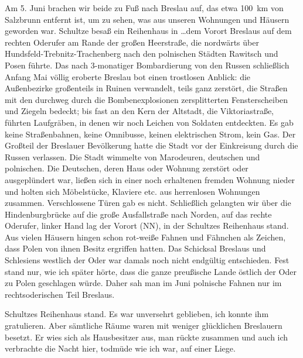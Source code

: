 \documentclass[a5paper,pagesize,10pt,twoside=true]{scrbook}
\renewcommand{\marginpar}[2][]{}
\begin{document}
Am 5. Juni brachen wir beide zu Fuß nach Breslau auf, das etwa 100~km von Salzbrunn entfernt ist, um zu sehen, was aus unseren Wohnungen und Häusern geworden \marginpar{85} war. Schultze besaß ein Reihenhaus in \dots dem Vorort Breslaus auf dem rechten Oderufer am Rande der großen Heerstraße, die nordwärts über Hundsfeld-Trebnitz-Trachenberg nach den polnischen Städten Rawitsch und Posen führte. Das nach 3-monatiger Bombardierung von den Russen schließlich Anfang Mai völlig eroberte Breslau bot einen trostlosen Anblick: die Außenbezirke großenteils in Ruinen verwandelt, teils ganz zerstört, die Straßen mit den durchweg durch die Bombenexplosionen zersplitterten Fensterscheiben und Ziegeln bedeckt; bis fast an den Kern der Altstadt, die Viktoriastraße, führten Laufgräben, in denen wir noch Leichen von Soldaten entdeckten. Es gab keine Straßenbahnen, keine Omnibusse, keinen elektrischen Strom, kein Gas. Der Großteil der Breslauer Bevölkerung hatte die Stadt vor der Einkreisung durch die Russen verlassen. Die Stadt wimmelte von Marodeuren, deutschen und polnischen. Die Deutschen, deren Haus oder Wohnung zerstört oder ausgeplündert war, ließen sich in einer noch erhaltenen fremden Wohnung nieder und holten sich Möbelstücke, Klaviere etc. aus herrenlosen Wohnungen zusammen. Verschlossene Türen gab es nicht. Schließlich gelangten wir \marginpar{86} über die Hindenburgbrücke auf die große Ausfallstraße nach Norden, auf das rechte Oderufer, linker Hand lag der Vorort (NN), in der Schultzes Reihenhaus stand. Aus vielen Häusern hingen schon rot-weiße Fahnen und Fähnchen als Zeichen, dass Polen von ihnen Besitz ergriffen hatten. Das Schicksal Breslaus und Schlesiens westlich der Oder war damals noch nicht endgültig entschieden. Fest stand nur, wie ich später hörte, dass die ganze preußische Lande östlich der Oder zu Polen geschlagen würde. Daher sah man im Juni polnische Fahnen nur im rechtsoderischen Teil Breslaus.

Schultzes Reihenhaus stand. Es war unversehrt geblieben, ich konnte ihm gratulieren. Aber sämtliche Räume waren mit weniger glücklichen Breslauern besetzt. Er wies sich als Hausbesitzer aus, man rückte zusammen und auch ich verbrachte die Nacht hier, todmüde wie ich war, auf einer Liege.
\end{document}
